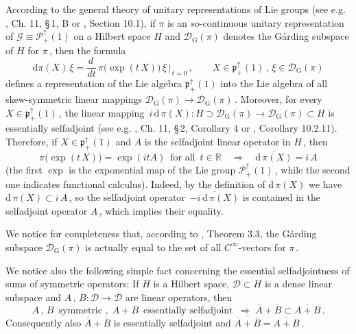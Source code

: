 \documentclass[reqno]{amsart}
\theoremstyle{definition}
\theoremstyle{remark}
\numberwithin{equation}{section}
\theoremstyle{plain}
\begin{document}
According to the general theory of unitary
representations of Lie groups (see e.g. \cite{Ba-Ra}, Ch. 11, \S$\,$1,
B or \cite{Schm}, Section 10.1), if $\pi$ is an $so$-continuous
unitary representation of $\mathcal G\equiv\mathcal P_+^\uparrow (1)$
on a Hilbert space $H$ and $\mathcal D_{\text{G}}(\pi )$ denotes the
G{\aa}rding subspace of $H$ for $\pi\,$, then the formula
\begin{equation*}
\text{d}\pi (X)\,\xi =\frac {d\,}{d t}\, \pi\big( \exp (t\, X)\big)
\,\xi\,\bigg|_{\, t=0}\, ,\qquad X\in\mathfrak p_+^\uparrow (1)\,
,\,\xi\in \mathcal D_{\text{G}}(\pi )
\end{equation*}
defines a representation of the Lie algebra
$\mathfrak p_+^\uparrow (1)$ into the Lie algebra of all
skew-symmetric linear mappings $\mathcal D_{\text{G}}(\pi )
\rightarrow\mathcal D_{\text{G}}(\pi )\,$. Moreover, for every
$X\in\mathfrak p_+^\uparrow (1)\,$, the linear mapping
$\, i\,\text{d}\,\pi (X) : H\supset\mathcal D_{\text{G}}(\pi )
\longrightarrow \mathcal D_{\text{G}}(\pi )\subset H$ is essentially
selfadjoint (see e.g. \cite{Ba-Ra}, Ch. 11, \S$\,$2, Corollary 4 or
\cite{Schm}, Corollary 10.2.11). Therefore, if
$X\in\mathfrak p_+^\uparrow (1)$ and $A$ is the selfadjoint linear
operator in $H\,$, then
\begin{equation}\label{closure}
\pi\big( \exp (t\, X)\big) =\exp (i t A)\,\text{ for all }\,t\in
\mathbb R\quad\Longrightarrow\quad\overline{\text{d}\,\pi (X)} =
i\, A
\end{equation}
(the first $\exp$ is the exponential map of the Lie group
$\mathcal P_+^\uparrow (1)\,$, while the second one indicates
functional calculus).
Indeed, by the definition of $\text{d}\,\pi (X)$
we have $\text{d}\,\pi (X)\subset i\, A\,$, so the selfadjoint
operator $\,\overline{-i\,\text{d}\,\pi (X)}$ is contained in
the selfadjoint operator $A\,$, which implies their equality.

We notice for completeness that, according to \cite{Dix-Mall},
Theorem 3.3, the G{\aa}rding subspace $\mathcal D_{\text{G}}(\pi )$
is actually equal to the set of all $C^\infty$-vectors for $\pi\,$.

We notice also the following simple fact concerning the essential
selfadjointness of sums of symmetric operators:
If $H$ is a Hilbert space, $\mathcal D\subset H$ is a dense linear
subspace and $A\, ,\, B : \mathcal D\longrightarrow\mathcal D$ are
linear operators, then
\begin{equation}\label{sum}
A\, ,\, B\,\text{ symmetric },\;
A+B\,\text{ essentially selfadjoint }\,\Longrightarrow\;
\overline{A} +\overline{B}\subset\overline{A+B}\, .
\end{equation}
Consequently also $\overline{A} +\overline{B}$ is essentially
selfadjoint and $\overline{\overline{A} +\overline{B}} =
\overline{A+B}\,$.
\end{document}
